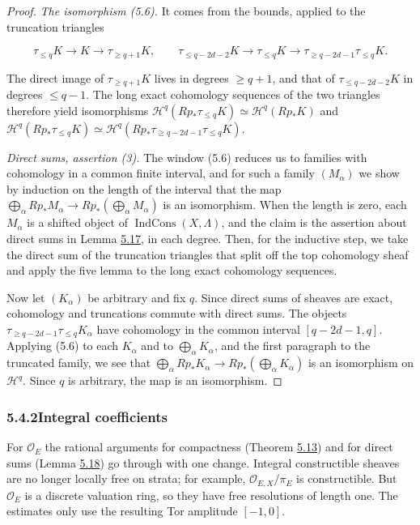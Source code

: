 \documentclass[11pt]{article}
\providecommand{\IndCons}{}\renewcommand{\IndCons}{\operatorname{IndCons}}
\begin{document}
\begin{proof}[{Proof}]
\emph{The isomorphism (5.6).} It comes from the bounds, applied to the truncation triangles

\[
\tau_{\leq q}K\to K\to\tau_{\geq q+1}K,
\qquad
\tau_{\leq q-2d-2}K\to\tau_{\leq q}K\to\tau_{\geq q-2d-1}\tau_{\leq q}K.
\]

The direct image of \(\tau_{\geq q+1}K\) lives in degrees \(\geq q+1\), and that of \(\tau_{\leq q-2d-2}K\) in degrees \(\leq q-1\). The long exact cohomology sequences of the two triangles therefore yield isomorphisms \(\mathcal H^q(Rp_*\tau_{\leq q}K)\simeq\mathcal H^q(Rp_*K)\) and \(\mathcal H^q(Rp_*\tau_{\leq q}K)\simeq
\mathcal H^q(Rp_*\tau_{\geq q-2d-1}\tau_{\leq q}K)\).

\emph{Direct sums, assertion (3).} The window (5.6) reduces us to families with cohomology in a common finite interval, and for such a family \((M_\alpha)\) we show by induction on the length of the interval that the map \(\bigoplus_\alpha Rp_*M_\alpha\to Rp_*(\bigoplus_\alpha M_\alpha)\) is an isomorphism. When the length is zero, each \(M_\alpha\) is a shifted object of \(\IndCons(X,\Lambda)\), and the claim is the assertion about direct sums in Lemma \hyperref[bp463]{5.17}, in each degree. Then, for the inductive step, we take the direct sum of the truncation triangles that split off the top cohomology sheaf and apply the five lemma to the long exact cohomology sequences.

Now let \((K_\alpha)\) be arbitrary and fix \(q\). Since direct sums of sheaves are exact, cohomology and truncations commute with direct sums. The objects \(\tau_{\geq q-2d-1}\tau_{\leq q}K_\alpha\) have cohomology in the common interval \([q-2d-1,q]\). Applying (5.6) to each \(K_\alpha\) and to \(\bigoplus_\alpha K_\alpha\), and the first paragraph to the truncated family, we see that \(\bigoplus_\alpha Rp_*K_\alpha\to Rp_*(\bigoplus_\alpha K_\alpha)\) is an isomorphism on \(\mathcal H^q\). Since \(q\) is arbitrary, the map is an isomorphism.
\end{proof}


\subsubsection*{\texorpdfstring{5.4.2\quad Integral coefficients}{5.4.2 Integral coefficients}}
\label{bp469}%
\label{bp470}%
For \(\mathcal O_E\) the rational arguments for compactness (Theorem \hyperref[bp446]{5.13}) and for direct sums (Lemma \hyperref[bp467]{5.18}) go through with one change. Integral constructible sheaves are no longer locally free on strata; for example, \(\mathcal O_{E,X}/\pi_E\) is constructible. But \(\mathcal O_E\) is a discrete valuation ring, so they have free resolutions of length one. The estimates only use the resulting Tor amplitude \([-1,0]\).
\end{document}
